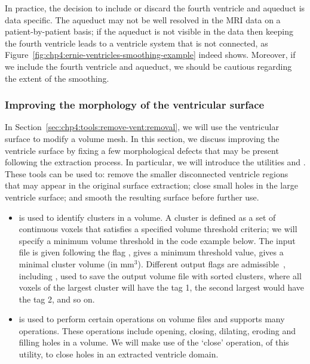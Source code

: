 In practice, the decision to include or discard the fourth ventricle
and aqueduct is data specific. The aqueduct may not be well resolved
in the MRI data on a patient-by-patient basis; if the aqueduct is not
visible in the data then keeping the fourth ventricle leads to a
ventricle system that is not connected, as
Figure~\ref{fig:chp4:ernie-ventricles-smoothing-example} indeed
shows. Moreover, if we include the fourth ventricle and aqueduct,
we should be cautious regarding the extent of the smoothing. 

\subsubsection*{Improving the morphology of the ventricular surface}
In Section~\ref{sec:chp4:tools:remove-vent:removal}, we will use the 
ventricular surface to modify a volume mesh.  In this section, we discuss 
improving the ventricle surface by fixing a few morphological defects that may 
be present following the extraction process.  In particular, we will introduce 
the \freesurfer{} utilities  and .  
These tools can be used to: remove the smaller disconnected ventricle regions 
that may appear in the original surface extraction; close small holes in the 
large ventricle surface; and smooth the resulting surface before further use. 

\begin{itemize}
\item
   is used to identify clusters in a volume. A
  cluster is defined as a set of continuous voxels that satisfies a
  specified volume threshold criteria; we will specify a minimum volume 
  threshold in the code example below. The input file is given following the 
  flag ,  gives a minimum threshold value,
   gives a minimal cluster volume (in
  mm$^3$). Different output flags are
  admissible~\cite{freesurfer-wiki}, including , used to
  save the output volume file with sorted clusters, where all voxels of
  the largest cluster will have the tag 1, the second largest would have
  the tag 2, and so on.
\item
   is used to perform certain operations on
  volume files and supports many operations.  These operations include opening, 
  closing, dilating, eroding and filling holes in a volume.  %
  We will make use of the `close' operation, of this utility, to close holes 
  in an extracted ventricle domain. 
\end{itemize}

